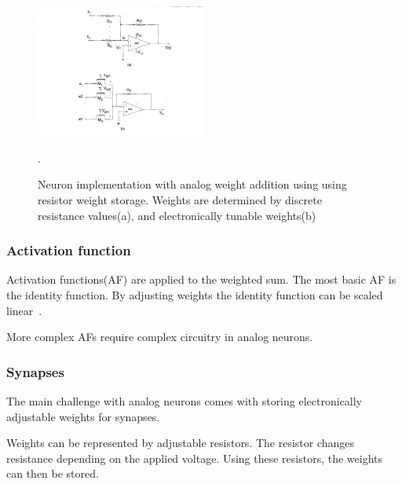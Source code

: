 \documentclass[conference]{IEEEtran}
\begin{document}
    \begin{figure}[h]
        \centering
        \includegraphics[width=0.5\textwidth]{resources/analog-weights.png}
        \caption{Neuron implementation with analog weight addition using using resistor weight storage.
        Weights are determined by discrete resistance values(a), and electronically tunable weights(b)~\cite[Fig.~1]{zurada1992analog}}.
        \label{fig:analogweights}
    \end{figure}

    \subsubsection{Activation function}

    Activation functions(AF) are applied to the weighted sum.
    The most basic AF is the identity function.
    By adjusting weights the identity function can be scaled linear~\cite{zurada1992analog}.

    More complex AFs require complex circuitry in analog neurons.

    \subsubsection{Synapses}
    The main challenge with analog neurons comes with storing electronically adjustable weights for synapses.

    Weights can be represented by adjustable resistors.
    The resistor changes resistance depending on the applied voltage.
    Using these resistors, the weights can then be stored.

\end{document}
